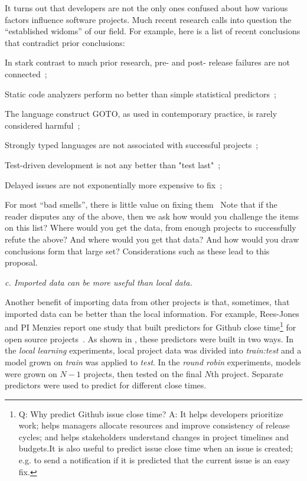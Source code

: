 It turns out that developers are not the only ones confused about how various factors influence software projects. 	
Much recent research calls into question  the
 ``established widoms'' of our field. For example, here is a list of recent conclusions that contradict prior conclusions:
\bi
\item In stark contrast to  much prior research, pre- and post- release failures are not connected~\cite{fenton2000quantitative};
\item Static code analyzers perform no better than simple statistical predictors~\cite{Fa13}; 
\item
The language construct GOTO, as used in contemporary practice, is rarely
considered harmful~\cite{nagappan2015empirical};
\item Strongly typed languages are not associated with successful projects~\cite{ray2014large};  
\item Test-driven development is not any better than "test last"~\cite{fucci2017dissection};
\item Delayed issues are not exponentially more expensive to fix~\cite{menzies2017delayed};
\item For most  ``bad smells'', there is little value on fixing them~\cite{krishna2017less}
\ei
Note that if the   reader disputes any of the above, then we ask how would you challenge the items on this list?
Where would you get the data, from enough projects to   successfully refute the above? And where would you get that data? And how would you draw conclusions form that large set? Considerations such as these lead to this proposal.
	


\begin{center}
{\em c. Imported data can be more useful than local data.}
\end{center}


Another benefit of  importing data from other projects is that, sometimes,
that imported data can be better than the local information.
For example, Rees-Jones and PI Menzies
report one study that built  predictors
for Github  close time\footnote{Q: Why predict Github issue close time? A:
 It helps developers prioritize work; helps managers allocate resources and improve consistency of release cycles; and helps stakeholders understand changes in project timelines and budgets.It is also useful to predict issue close time when an issue is created; e.g.  to send a notification if it is predicted that the current issue is an easy fix.}
 for open source projects~\cite{rees2017better}. As shown in ,
these predictors
were built in two ways.
In the {\em local learning} experiments,
local  project data was divided into 
{\em train:test} 
and  a
  model grown on {\em train} was applied to 
{\em test}.  In the {\em round robin} experiments,
models were grown on $N-1$ projects,
then tested on the final $N$th project. 
Separate  predictors were used to predict for different close times.

